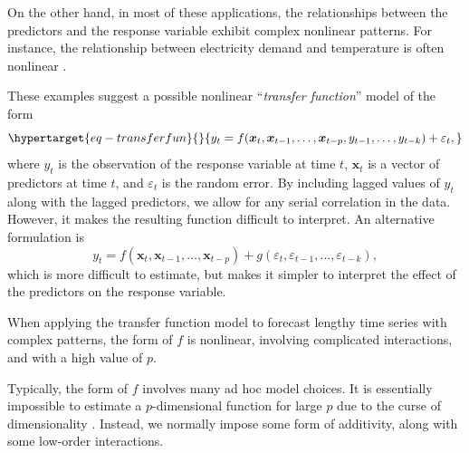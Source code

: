 \documentclass[11pt,a4paper,]{article}
\begin{document}
On the other hand, in most of these applications, the relationships
between the predictors and the response variable exhibit complex
nonlinear patterns. For instance, the relationship between electricity
demand and temperature is often nonlinear \autocite{HF2010,FH2012}.

These examples suggest a possible nonlinear ``\emph{transfer function}''
model of the form
\begin{equation}\protect\hypertarget{eq-transferfun}{}{
 y_t = f(\bm{x}_{t}, \bm{x}_{t-1}, \dots,\bm{x}_{t-p}, y_{t-1},\dots,y_{t-k}) + \varepsilon_{t},
}\label{eq-transferfun}\end{equation} where \(y_{t}\) is the observation
of the response variable at time \(t\), \(\bm{x}_{t}\) is a vector of
predictors at time \(t\), and \(\varepsilon_{t}\) is the random error.
By including lagged values of \(y_{t}\) along with the lagged
predictors, we allow for any serial correlation in the data. However, it
makes the resulting function difficult to interpret. An alternative
formulation is \[
 y_t = f(\bm{x}_{t}, \bm{x}_{t-1}, \dots,\bm{x}_{t-p}) + g(\varepsilon_{t}, \varepsilon_{t-1},\dots,\varepsilon_{t-k}),
\] which is more difficult to estimate, but makes it simpler to
interpret the effect of the predictors on the response variable.

When applying the transfer function model to forecast lengthy time
series with complex patterns, the form of \(f\) is nonlinear, involving
complicated interactions, and with a high value of \(p\).

Typically, the form of \(f\) involves many ad hoc model choices. It is
essentially impossible to estimate a \(p\)-dimensional function for
large \(p\) due to the curse of dimensionality
\autocite{Bellman57,Stone82}. Instead, we normally impose some form of
additivity, along with some low-order interactions.
\end{document}
